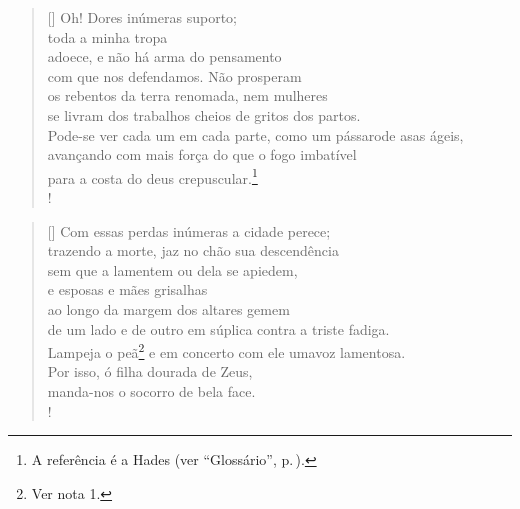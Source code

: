 \pagebreak
{}
\settowidth{\versewidth}{brilhante? Tenso, agito-me com medo em meu trêmulo}
\begin{verse}[\versewidth]
Oh! Dores inúmeras suporto;\\
toda a minha tropa\\
adoece, e não há arma do pensamento\\
com que nos defendamos. Não prosperam\\
os rebentos da terra renomada, nem mulheres\\
se livram dos trabalhos cheios de gritos dos partos.\\
Pode-se ver cada um em cada parte, como um pássaro\qb de asas ágeis,\\
avançando com mais força do que o fogo imbatível\\
para a costa do deus crepuscular.\footnote{A referência é a Hades (ver ``Glossário'', p.\,\pageref{glossario}).}\\!
\end{verse} 

\begin{verse}[\versewidth]
Com essas perdas inúmeras a cidade perece;\\ %
trazendo a morte, jaz no chão sua descendência\\
sem que a lamentem ou dela se apiedem,\\
e esposas e mães grisalhas\\
ao longo da margem dos altares gemem\\
de um lado e de outro em súplica contra a triste fadiga.\\
Lampeja o peã\footnote{Ver nota 1.} %
e em concerto com ele uma\qb voz lamentosa.\\
Por isso, ó filha dourada de Zeus,\\
manda-nos o socorro de bela face.\\!
\end{verse} 


